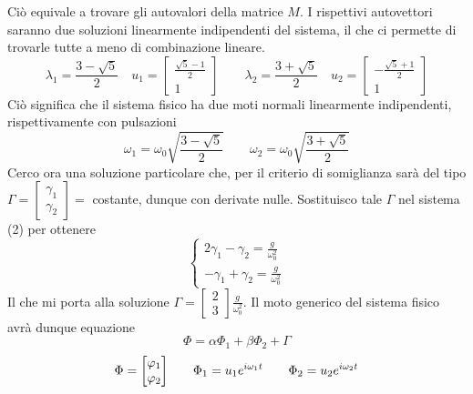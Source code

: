 \documentclass{scrartcl}
\renewcommand{\phi}{\varphi}
\begin{document}
    Ciò equivale a trovare gli autovalori della matrice \(M\). I rispettivi autovettori saranno due soluzioni linearmente indipendenti del sistema, il che ci permette di trovarle tutte a meno di combinazione lineare.
    \begin{equation}
        \lambda_1 = \frac{3-\sqrt{5}}{2} \quad u_1 = \begin{bmatrix} \frac{\sqrt{5}-1}{2} \\ 1 \end{bmatrix} \qquad \lambda_2 = \frac{3+\sqrt{5}}{2} \quad u_2 = \begin{bmatrix} - \frac{\sqrt{5}+1}{2} \\  1\end{bmatrix}
    \end{equation}
    Ciò significa che il sistema fisico ha due moti normali linearmente indipendenti, rispettivamente con pulsazioni
    \[\omega_1 = \omega_0 \sqrt{\frac{3-\sqrt{5}}{2}} \qquad \omega_2 = \omega_0 \sqrt{\frac{3+\sqrt{5}}{2}}\]
    Cerco ora una soluzione particolare che, per il criterio di somiglianza sarà del tipo \(\Gamma = \begin{bmatrix}\gamma_1 \\ \gamma_2\end{bmatrix} = \) costante, dunque con derivate nulle. Sostituisco tale \(\Gamma\) nel sistema (2) per ottenere
    \begin{equation}
        \begin{cases}
            2 \gamma_1 -\gamma_2 = \frac{g}{\omega_0^2} \\
            - \gamma_1 + \gamma_2 = \frac{g}{\omega_0^2}
        \end{cases}
    \end{equation}
    Il che mi porta alla soluzione \(\Gamma = \begin{bmatrix}2 \\ 3\end{bmatrix} \frac{g}{\omega_0^2}\).
    Il moto generico del sistema fisico avrà dunque equazione
    \begin{equation}
        \Phi = \alpha \Phi_1 + \beta \Phi_2 + \Gamma 
    \end{equation}
    \[\Phi = \mqty[\phi_1 \\ \phi_2] \qquad \Phi_1 = u_1 e^{i \omega_1 t} \qquad \Phi_2 = u_2 e^{i \omega_2 t}\]
\end{document}
